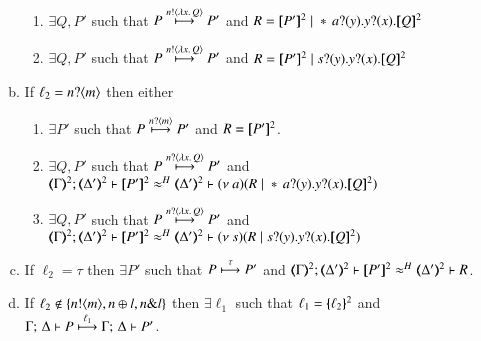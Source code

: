 \begin{proposition}
\begin{enumerate}[1.]
\begin{enumerate}[a)]
\begin{enumerate}[-]
					\item	$\exists Q, P'$ such that $P \stackrel{n ! \langle \lambda x.\,Q \rangle}{\longmapsto} P'$
						and $R = \map{P'}^{2} \Par \repl{} \binp{a}{y} \binp{y}{x} \pmap{Q}{2}$

					\item	$\exists Q, P'$ such that $P \stackrel{n ! \langle \lambda x.\,Q \rangle}{\longmapsto} P'$
						and $R = \map{P'}^{2} \Par \binp{s}{y} \binp{y}{x} \pmap{Q}{2}$
					\end{enumerate}

				\item   %
					If  $\ell_2 = n ? \langle m \rangle$ 
					then either
					\begin{enumerate}[-]
					\item	$\exists P'$ such that $P \stackrel{n ? \langle m \rangle}{\longmapsto} P'$
						and $R = [\!\![P']\!\!]^{2}$.

					\item	$\exists Q, P'$ such that
						$P \stackrel{n ? \langle \lambda x.\,Q \rangle}{\longmapsto} P'$
						and $\horel{\mapt{\Gamma}^{2}}{\mapt{\Delta'}^{2}}{\map{P'}^{2}}{\wb}{\mapt{\Delta'}^{2}}{\news{a}(R \Par \repl{} \binp{a}{y} \binp{y}{x} \pmap{Q}{2})}$
					\item	$\exists Q, P'$ such that
						$P \stackrel{n ? \langle \lambda x.\,Q \rangle}{\longmapsto} P'$
						and $\horel{\mapt{\Gamma}^{2}}{\mapt{\Delta'}^{2}}{\map{P'}^{2}}{\wb}{\mapt{\Delta'}^{2}}{\news{s}(R \Par \binp{s}{y} \binp{y}{x} \pmap{Q}{2})}$  
					\end{enumerate}
		
				\item   
					If  %
					$\ell_2 = \tau$ 
					then $\exists P'$ such that
					$P \stackrel{\tau}{\longmapsto} P'$
					and $\horel{\mapt{\Gamma}^{2}}{\mapt{\Delta'}^{2}}{\map{P'}^{2}}{\wb}{\mapt{\Delta'}^{2}}{R}$.
				\item	 
					If  
					$\ell_2 \not\in \{n ! \langle m \rangle, n \oplus l, n \& l\}$ 
					 then 
					$\exists \ell_1$ such that 
					$\ell_1 = \{\!\!\{\ell_2\}\!\!\}^{2}$ and \\
					$ \Gamma ;\, \Delta  \vdash   P
					\stackrel{\ell_1}{\longmapsto}
					\Gamma ;\, \Delta  \vdash   P'$.
		\end{enumerate}
	\end{enumerate}
\end{proposition}


